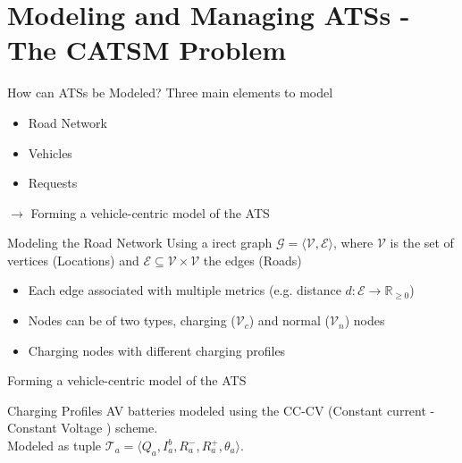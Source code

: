 \section{Modeling and Managing ATSs - The CATSM Problem} 

\begin{frame}{How can ATSs be Modeled?}
	Three main elements to model
	\vspace{0.5cm}
	\begin{itemize}
		\item Road Network
		\item Vehicles
		\item Requests
	\end{itemize}
	\vspace{0.5cm}
	$\rightarrow$ Forming a vehicle-centric model of the ATS
\end{frame}

\begin{frame}{Modeling the Road Network}
	Using a irect graph $\mathcal{G} = \langle \mathcal{V}, \mathcal{E} \rangle$, where $\mathcal{V}$ is the set of vertices (Locations) and $\mathcal{E} \subseteq \mathcal{V} \times \mathcal{V}$ the edges (Roads)
	\vspace{0.5cm}
	\begin{itemize}
		\item Each edge associated with multiple metrics (e.g. distance $d: \mathcal{E} \rightarrow \mathbb{R}_{\geq 0}$)
		\item Nodes can be of two types, charging ($\mathcal{V}_c$) and normal ($\mathcal{V}_n$) nodes 
		\item Charging nodes with different charging profiles
	\end{itemize}
	\vspace{0.5cm}
	Forming a vehicle-centric model of the ATS
\end{frame}



\begin{frame}{Charging Profiles}
	AV batteries modeled using the CC-CV (Constant current - Constant Voltage ) scheme. \\
	Modeled as tuple  $\mathcal{T}_a =\langle Q_a, I^b_a, R^-_a, R^+_a,\theta_a\rangle$. 
	\vspace{0.1cm}
	
\end{frame}


